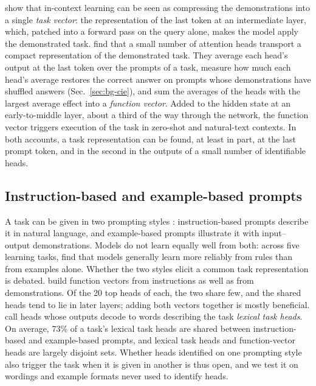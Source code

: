 \documentclass[10pt,a4paper]{article}
\begin{document}
\citet{hendel2023incontext} show that in-context learning can be seen as compressing the demonstrations into a single \emph{task vector}: the representation of the last token at an intermediate layer, which, patched into a forward pass on the query alone, makes the model apply the demonstrated task. \citet{todd2024function} find that a small number of attention heads transport a compact representation of the demonstrated task. They average each head's output at the last token over the prompts of a task, measure how much each head's average restores the correct answer on prompts whose demonstrations have shuffled answers (Sec.~\ref{sec:bg-cie}), and sum the averages of the heads with the largest average effect into a \emph{function vector}. Added to the hidden state at an early-to-middle layer, about a third of the way through the network, the function vector triggers execution of the task in zero-shot and natural-text contexts. In both accounts, a task representation can be found, at least in part, at the last prompt token, and in the second in the outputs of a small number of identifiable heads.

\subsection{Instruction-based and example-based prompts}\label{sec:bg-styles}

A task can be given in two prompting styles \citep{yang2026shared}: instruction-based prompts describe it in natural language, and example-based prompts illustrate it with input--output demonstrations. Models do not learn equally well from both: across five learning tasks, \citet{fu2026rules} find that models generally learn more reliably from rules than from examples alone. Whether the two styles elicit a common task representation is debated. \citet{davidson2025different} build function vectors from instructions as well as from demonstrations. Of the 20 top heads of each, the two share few, and the shared heads tend to lie in later layers; adding both vectors together is mostly beneficial. \citet{yang2026shared} call heads whose outputs decode to words describing the task \emph{lexical task heads}. On average, 73\% of a task's lexical task heads are shared between instruction-based and example-based prompts, and lexical task heads and function-vector heads are largely disjoint sets. Whether heads identified on one prompting style also trigger the task when it is given in another is thus open, and we test it on wordings and example formats never used to identify heads.
\end{document}
